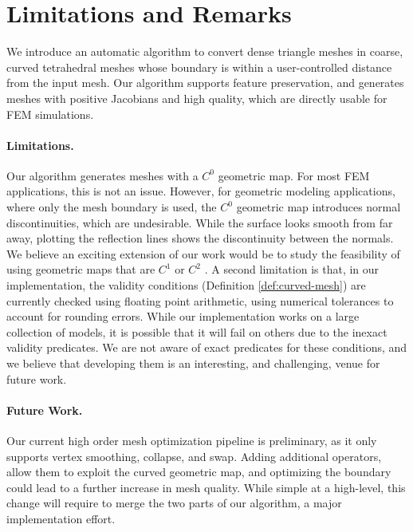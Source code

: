 \section{Limitations and Remarks}\label{cumin:sec:conclusion}

We introduce an automatic algorithm to convert dense triangle meshes in coarse, curved tetrahedral meshes whose boundary is within a user-controlled distance from the input mesh. Our algorithm supports feature preservation, and generates meshes with positive Jacobians and high quality, which are directly usable for FEM simulations. 

\paragraph{Limitations.} Our algorithm generates meshes with a $C^0$ geometric map. For most FEM applications, this is not an issue. However, for geometric modeling applications, where only the mesh boundary is used, the $C^0$ geometric map introduces normal discontinuities, which are undesirable.
While the surface looks smooth from  far away, plotting the reflection lines shows the discontinuity between the normals. We believe an exciting extension of our work would be to study the feasibility of using geometric maps that are $C^1$ \cite{lyche2015simplex} or $C^2$ \cite{Xia:2017:IGA}. A second limitation is that, in our implementation, the validity conditions (Definition \ref{def:curved-mesh}) are currently checked using floating point arithmetic, using numerical tolerances to account for rounding errors. While our implementation works on a large collection of models, it is possible that it will fail on others due to the inexact validity predicates. We are not aware of exact predicates for these conditions, and we believe that developing them is an interesting, and challenging, venue for future work.

\paragraph{Future Work.} Our current high order mesh optimization pipeline is preliminary, as it only supports vertex smoothing, collapse, and swap. Adding additional operators, allow them to exploit the curved geometric map, and optimizing the boundary could lead to a further increase in mesh quality. While simple at a high-level, this change will require to merge the two parts of our algorithm, a major implementation effort.

